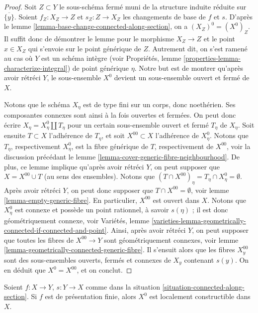 \begin{proof}
Soit $Z \subset Y$ le sous-schéma fermé muni de la structure induite réduite
sur $\overline{\{y\}}$. Soient $f_Z : X_Z \to Z$ et $s_Z : Z \to X_Z$
les changements de base de $f$ et $s$. D'après le
lemme \ref{lemma-base-change-connected-along-section},
on a $(X_Z)^0 = (X^0)_Z$. Il suffit donc de démontrer le lemme pour
le morphisme $X_Z \to Z$ et le point $x \in X_Z$ qui s'envoie sur le point générique
de $Z$. Autrement dit, on s'est ramené au cas
où $Y$ est un schéma intègre (voir
Propriétés, lemme \ref{properties-lemma-characterize-integral})
de point générique $\eta$. Notre but est de montrer qu'après avoir rétréci
$Y$, le sous-ensemble $X^0$ devient un sous-ensemble ouvert et fermé de $X$.

\medskip\noindent
Notons que le schéma $X_\eta$ est de type fini sur un corps, donc noethérien.
Ses composantes connexes sont ainsi à la fois ouvertes et fermées. On peut donc écrire
$X_\eta = X_\eta^0 \amalg T_\eta$ pour un certain sous-ensemble ouvert et fermé
$T_\eta$ de $X_\eta$. Soit ensuite $T \subset X$ l'adhérence de $T_\eta$,
et soit $X^{00} \subset X$ l'adhérence de $X_\eta^0$. Notons que
$T_\eta$, respectivement $X^0_\eta$, est la fibre générique de $T$, respectivement de $X^{00}$,
voir la discussion précédant le
lemme \ref{lemma-cover-generic-fibre-neighbourhood}.
De plus, ce lemme implique qu'après avoir rétréci $Y$, on peut supposer que
$X = X^{00} \cup T$ (au sens des ensembles).
Notons que $(T \cap X^{00})_\eta = T_\eta \cap X^0_\eta = \emptyset$.
Après avoir rétréci $Y$, on peut donc supposer que $T \cap X^{00} = \emptyset$, voir
lemme \ref{lemma-empty-generic-fibre}.
En particulier, $X^{00}$ est ouvert dans $X$. Notons que $X^0_\eta$ est connexe
et possède un point rationnel, à savoir $s(\eta)$ ; il est donc géométriquement
connexe, voir
Variétés,
lemme \ref{varieties-lemma-geometrically-connected-if-connected-and-point}.
Ainsi, après avoir rétréci $Y$, on peut supposer que toutes les fibres de $X^{00} \to Y$
sont géométriquement connexes, voir
lemme \ref{lemma-geometrically-connected-generic-fibre}.
Il s'ensuit alors que les fibres $X^{00}_y$ sont des
sous-ensembles ouverts, fermés et connexes de $X_y$ contenant $s(y)$.
On en déduit que $X^0 = X^{00}$, et on conclut.
\end{proof}

\begin{lemma}
\label{lemma-connected-along-section-locally-constructible}
Soient $f : X \to Y$, $s : Y \to X$ comme dans la
situation \ref{situation-connected-along-section}.
Si $f$ est de présentation finie, alors $X^0$ est localement constructible
dans $X$.
\end{lemma}

